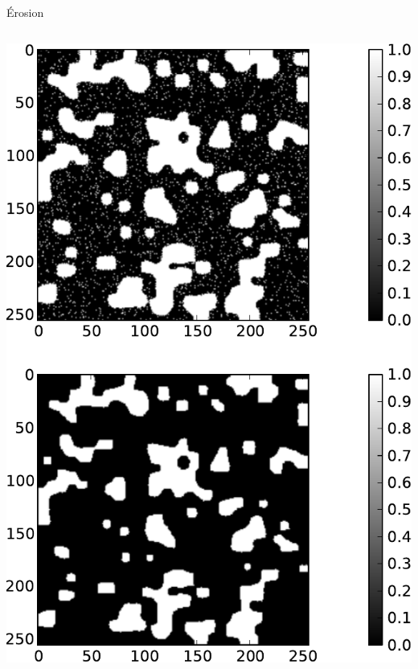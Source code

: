 \documentclass[8pt,a4paper]{beamer}
\begin{document}
\begin{frame}[containsverbatim]{Érosion}
  \begin{columns}
  \includegraphics[width=\textwidth]{figures/erosion.pdf} 
  
    \end{columns}
\end{frame}  
\end{document}

